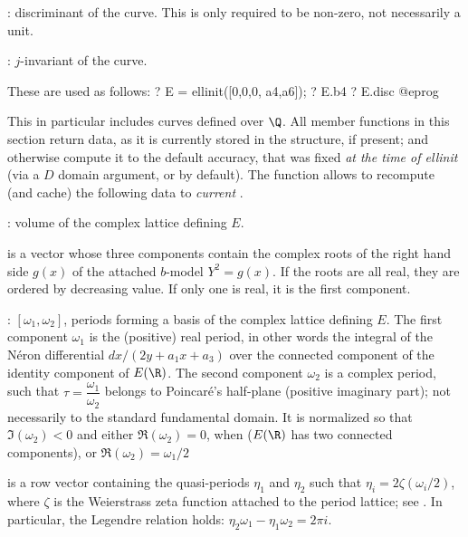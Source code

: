 \item {}: discriminant of the curve. This is only required to be
non-zero, not necessarily a unit.

\item {}: $j$-invariant of the curve.

\noindent These are used as follows:
\bprog
? E = ellinit([0,0,0, a4,a6]);
? E.b4
? E.disc
@eprog


This in particular includes curves defined over $\Q$. All member functions in
this section return data, as it is currently stored in the structure, if
present; and otherwise compute it to the default accuracy, that was fixed
\emph{at the time of ellinit} (via a  $D$ domain argument, or
 by default). The function  allows to
recompute (and cache) the following data to \emph{current}
.

\item {}: volume of the complex lattice defining $E$.

\item {} is a vector whose three components contain the complex
roots of the right hand side $g(x)$ of the attached $b$-model $Y^2 = g(x)$.
If the roots are all real, they are ordered by decreasing value. If only one
is real, it is the first component.

\item {}: $[\omega_1,\omega_2]$, periods forming a basis of the
complex lattice defining $E$. The first component $\omega_1$ is the
(positive) real period, in other words the integral of the N\'eron
differential $dx/(2y+a_1x+a_3)$
over the connected component of the identity component of $E(\R)$.
The second component $\omega_2$ is a complex period, such that
$\tau=\dfrac{\omega_1}{\omega_2}$ belongs to Poincar\'e's
half-plane (positive imaginary part); not necessarily to the standard
fundamental domain. It is normalized so that $\Im(\omega_2) < 0$
and either $\Re(\omega_2) = 0$, when  ($E(\R)$ has two connected
components), or $\Re(\omega_2) = \omega_1/2$

\item {} is a row vector containing the quasi-periods $\eta_1$ and
$\eta_2$ such that $\eta_i = 2\zeta(\omega_i/2)$, where $\zeta$ is the
Weierstrass zeta function attached to the period lattice; see
. In particular, the Legendre relation holds: $\eta_2\omega_1 -
\eta_1\omega_2 = 2\pi i$.

